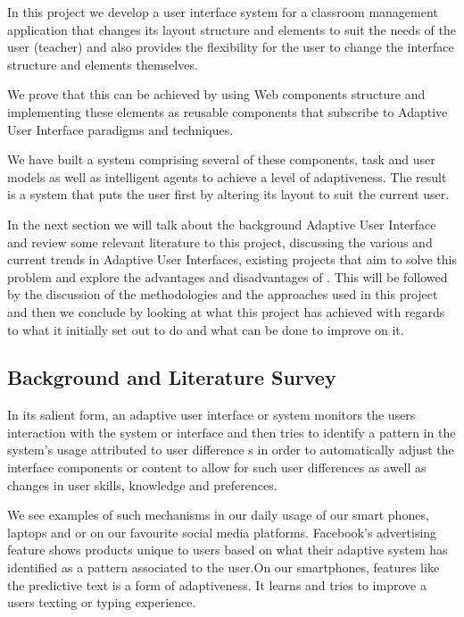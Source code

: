 In this project we develop a user interface system for a classroom management application that changes its layout structure and elements to suit the needs of the user (teacher) and also provides the flexibility for the user to change the interface structure and elements themselves.

We prove that this can be achieved by using Web components \cite{website:Mozilla-Developer} structure and implementing these elements as reusable components that subscribe to Adaptive User Interface paradigms and techniques.

We have built a system comprising several of these components, task and user models as well as intelligent agents to achieve a level of adaptiveness. The result is a system that puts the user first by altering its layout to suit the current user.

In the next section we will talk about the background Adaptive User Interface and review some relevant literature to this project, discussing the various and current trends in Adaptive User Interfaces, existing projects that aim to solve this problem and explore the advantages and disadvantages of . This will be followed by the discussion of the methodologies and the approaches used in this project and then we conclude by looking at what this project has achieved with regards to what it initially set out to do and what can be done to improve on it. 
\subsection{Background and Literature Survey} \label{sub:background}
In its salient form, an adaptive user interface or system monitors the users interaction with the system or interface and then tries to identify a pattern in the system's usage attributed to user difference s in order to automatically adjust the interface components or content to allow for such user differences as awell as changes in user skills, knowledge and preferences.

We see examples of such mechanisms in our daily usage of our smart phones, laptops and or on our favourite social media platforms. Facebook's advertising feature shows products unique to users based on what their adaptive system has identified as a pattern associated to the user.On our smartphones, features like the predictive text is a form of adaptiveness. It learns and tries to improve a users texting or typing experience.
